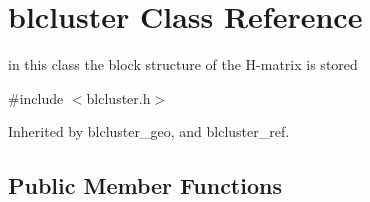 \hypertarget{classblcluster}{
\section{blcluster \-Class \-Reference}
\label{classblcluster}
}


in this class the block structure of the \-H-\/matrix is stored  




{\ttfamily \#include $<$blcluster.\-h$>$}



\-Inherited by blcluster\-\_\-geo, and blcluster\-\_\-ref.

\subsection*{\-Public \-Member \-Functions}
